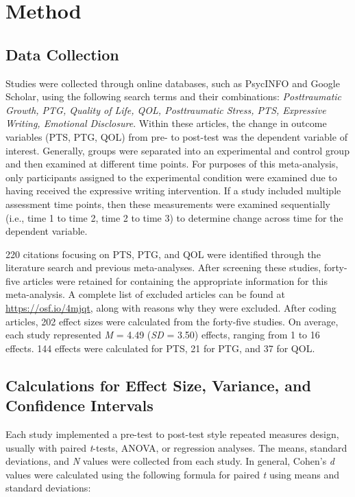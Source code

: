 \documentclass[english,man]{apa6}
\theoremstyle{definition}
\theoremstyle{definition}
\theoremstyle{definition}
\theoremstyle{remark}
\begin{document}
\section{Method}\label{method}

\subsection{Data Collection}\label{data-collection}

Studies were collected through online databases, such as PsycINFO and
Google Scholar, using the following search terms and their combinations:
\emph{Posttraumatic Growth, PTG, Quality of Life, QOL, Posttraumatic
Stress, PTS, Expressive Writing, Emotional Disclosure}. Within these
articles, the change in outcome variables (PTS, PTG, QOL) from pre- to
post-test was the dependent variable of interest. Generally, groups were
separated into an experimental and control group and then examined at
different time points. For purposes of this meta-analysis, only
participants assigned to the experimental condition were examined due to
having received the expressive writing intervention. If a study included
multiple assessment time points, then these measurements were examined
sequentially (i.e., time 1 to time 2, time 2 to time 3) to determine
change across time for the dependent variable.

220 citations focusing on PTS, PTG, and QOL were identified through the
literature search and previous meta-analyses. After screening these
studies, forty-five articles were retained for containing the
appropriate information for this meta-analysis. A complete list of
excluded articles can be found at \url{https://osf.io/4mjqt}, along with
reasons why they were excluded. After coding articles, 202 effect sizes
were calculated from the forty-five studies. On average, each study
represented \emph{M} = 4.49 (\emph{SD} = 3.50) effects, ranging from 1
to 16 effects. 144 effects were calculated for PTS, 21 for PTG, and 37
for QOL.

\subsection{Calculations for Effect Size, Variance, and Confidence
Intervals}\label{calculations-for-effect-size-variance-and-confidence-intervals}

Each study implemented a pre-test to post-test style repeated measures
design, usually with paired \emph{t}-tests, ANOVA, or regression
analyses. The means, standard deviations, and \emph{N} values were
collected from each study. In general, Cohen's \emph{d} values were
calculated using the following formula for paired \emph{t} using means
and standard deviations:
\end{document}
